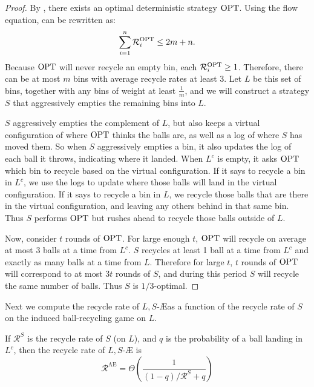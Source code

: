 \begin{proof}
	By , there exists an optimal deterministic
	strategy $\textrm{OPT}$. Using the flow equation,  can be
	rewritten as:
	\[ \sum_{i=1}^n \mathcal{R}_i^{\textrm{OPT}} \leq 2m + n. \]
	Because $\textrm{OPT}$ will never recycle an empty bin, each $\mathcal{R}_i^{\textrm{OPT}}
	\geq 1$.  Therefore, there can be at most $m$ bins with average recycle
	rates at least 3. Let $L$ be this set of bins, together with any bins of
	weight at least $\frac{1}{m}$, and we will construct a strategy $S$ that
	aggressively empties the remaining bins into $L$.
	
	$S$ aggressively empties the complement of $L$, but also keeps a virtual
	configuration of where $\textrm{OPT}$ thinks the balls are, as well as a log of
	where $S$ has moved them. So when $S$ aggressively empties a bin, it also
	updates the log of each ball it throws, indicating where it landed. When
	$L^c$ is empty, it asks $\textrm{OPT}$ which bin to recycle based on the virtual
	configuration. If it says to recycle a bin in $L^c$, we use the logs to
	update where those balls will land in the virtual configuration. If it says
	to recycle a bin in $L$, we recycle those balls that are there in the
	virtual configuration, and leaving any others behind in that same bin.
	Thus $S$ performs $\textrm{OPT}$ but rushes ahead to recycle those balls outside of
	$L$.

	Now, consider $t$ rounds of $\textrm{OPT}$. For large enough $t$, $\textrm{OPT}$ will
	recycle on average at most 3 balls at a time from $L^c$. $S$ recycles at
	least 1 ball at a time from $L^c$ and exactly as many balls at a time from
	$L$.  Therefore for large $t$, $t$ rounds of $\textrm{OPT}$ will correspond to at
	most $3t$ rounds of $S$, and during this period $S$ will recycle the same
	number of balls. Thus $S$ is $1/3$-optimal.
\end{proof}

Next we compute the recycle rate of $L,S$-\AE as a function of the recycle rate
of $S$ on the induced ball-recycling game on $L$.

\begin{lemma}\label{lem:aggro-empty-bounds}
	If $\mathcal{R}^S$ is the recycle rate of $S$ (on $L$), and $q$ is the
	probability of a ball landing in $L^c$, then the recycle rate of $L,S$-\AE
	is
	\[\mathcal{R}^\textrm{AE} = \Theta\left(\frac{1}{(1 - q)/\mathcal{R}^S + q}\right)\]
\end{lemma}

